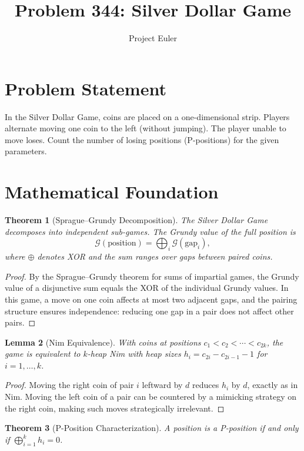 \documentclass[a4paper,12pt]{article}
\title{Problem 344: Silver Dollar Game}
\author{Project Euler}
\date{}
\newtheorem{theorem}{Theorem}
\newtheorem{lemma}[theorem]{Lemma}
\begin{document}
\maketitle

\section{Problem Statement}
In the Silver Dollar Game, coins are placed on a one-dimensional strip. Players alternate moving one coin to the left (without jumping). The player unable to move loses. Count the number of losing positions (P-positions) for the given parameters.

\section{Mathematical Foundation}

\begin{theorem}[Sprague--Grundy Decomposition]
The Silver Dollar Game decomposes into independent sub-games. The Grundy value of the full position is
\[
\mathcal{G}(\text{position}) = \bigoplus_{i} \mathcal{G}(\text{gap}_i),
\]
where $\oplus$ denotes XOR and the sum ranges over gaps between paired coins.
\end{theorem}

\begin{proof}
By the Sprague--Grundy theorem for sums of impartial games, the Grundy value of a disjunctive sum equals the XOR of the individual Grundy values. In this game, a move on one coin affects at most two adjacent gaps, and the pairing structure ensures independence: reducing one gap in a pair does not affect other pairs.
\end{proof}

\begin{lemma}[Nim Equivalence]
With coins at positions $c_1 < c_2 < \cdots < c_{2k}$, the game is equivalent to $k$-heap Nim with heap sizes $h_i = c_{2i} - c_{2i-1} - 1$ for $i = 1, \ldots, k$.
\end{lemma}

\begin{proof}
Moving the right coin of pair $i$ leftward by $d$ reduces $h_i$ by $d$, exactly as in Nim. Moving the left coin of a pair can be countered by a mimicking strategy on the right coin, making such moves strategically irrelevant.
\end{proof}

\begin{theorem}[P-Position Characterization]
A position is a P-position if and only if $\bigoplus_{i=1}^{k} h_i = 0$.
\end{theorem}
\end{document}

